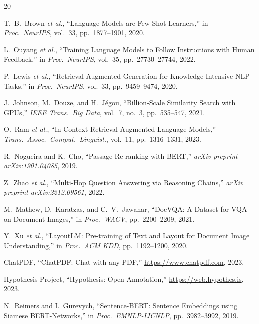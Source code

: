 \documentclass[conference]{IEEEtran}
\begin{document}
\begin{thebibliography}{20}

T.\ B.\ Brown \textit{et al.}, ``Language Models are Few-Shot Learners,'' in \textit{Proc.\ NeurIPS}, vol.\ 33, pp.\ 1877--1901, 2020.

L.\ Ouyang \textit{et al.}, ``Training Language Models to Follow Instructions with Human Feedback,'' in \textit{Proc.\ NeurIPS}, vol.\ 35, pp.\ 27730--27744, 2022.

P.\ Lewis \textit{et al.}, ``Retrieval-Augmented Generation for Knowledge-Intensive NLP Tasks,'' in \textit{Proc.\ NeurIPS}, vol.\ 33, pp.\ 9459--9474, 2020.

J.\ Johnson, M.\ Douze, and H.\ J\'{e}gou, ``Billion-Scale Similarity Search with GPUs,'' \textit{IEEE Trans.\ Big Data}, vol.\ 7, no.\ 3, pp.\ 535--547, 2021.

O.\ Ram \textit{et al.}, ``In-Context Retrieval-Augmented Language Models,'' \textit{Trans.\ Assoc.\ Comput.\ Linguist.}, vol.\ 11, pp.\ 1316--1331, 2023.

R.\ Nogueira and K.\ Cho, ``Passage Re-ranking with BERT,'' \textit{arXiv preprint arXiv:1901.04085}, 2019.

Z.\ Zhao \textit{et al.}, ``Multi-Hop Question Answering via Reasoning Chains,'' \textit{arXiv preprint arXiv:2212.09561}, 2022.

M.\ Mathew, D.\ Karatzas, and C.\ V.\ Jawahar, ``DocVQA: A Dataset for VQA on Document Images,'' in \textit{Proc.\ WACV}, pp.\ 2200--2209, 2021.

Y.\ Xu \textit{et al.}, ``LayoutLM: Pre-training of Text and Layout for Document Image Understanding,'' in \textit{Proc.\ ACM KDD}, pp.\ 1192--1200, 2020.

ChatPDF, ``ChatPDF: Chat with any PDF,'' \url{https://www.chatpdf.com}, 2023.

Hypothesis Project, ``Hypothesis: Open Annotation,'' \url{https://web.hypothes.is}, 2023.

N.\ Reimers and I.\ Gurevych, ``Sentence-BERT: Sentence Embeddings using Siamese BERT-Networks,'' in \textit{Proc.\ EMNLP-IJCNLP}, pp.\ 3982--3992, 2019.


\end{thebibliography}
\end{document}
